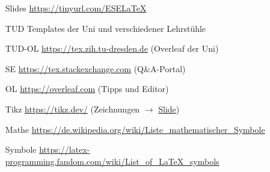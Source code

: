 \documentclass{article}
\begin{document}
\begin{itemize}
	\item[Slides] \url{https://tinyurl.com/ESELaTeX}
	\item[TUD] Templates der Uni und verschiedener Lehrstühle
	\item[TUD-OL] \url{https://tex.zih.tu-dresden.de} (Overleaf der Uni)
	\item[SE] \url{https://tex.stackexchange.com} (Q\&A-Portal)
	\item[OL] \url{https://overleaf.com} (Tipps und Editor)
	\item[Tikz] \url{https://tikz.dev/}
		(Zeichnungen $\to$ \hyperlink{tikz-final}{Slide})
	\item[Mathe] \url{https://de.wikipedia.org/wiki/Liste_mathematischer_Symbole}
	\item[Symbole] \url{https://latex-programming.fandom.com/wiki/List_of_LaTeX_symbols}
\end{itemize}
\end{document}
